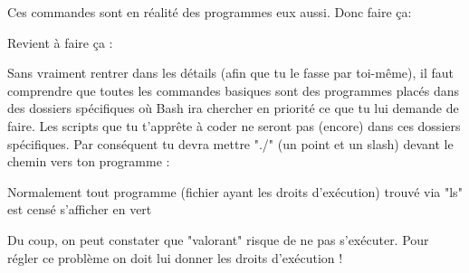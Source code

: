 \documentclass[a4paper, 12pt]{article}
\begin{document}
{    Ces commandes sont en réalité des programmes eux aussi. Donc faire ça:

    Revient à faire ça :
    \vspace{0.6cm}

    Sans vraiment rentrer dans les détails (afin que tu le fasse par toi-même),
    il faut comprendre que toutes les commandes basiques sont des programmes placés dans des
    dossiers spécifiques où Bash ira chercher en priorité ce que tu lui demande de faire.
    \newline \newline
    Les scripts que tu t'apprête à coder ne seront pas (encore) dans ces dossiers spécifiques.
    Par conséquent tu devra mettre "./" (un point et un slash) devant le chemin vers ton programme :


    Normalement tout programme (fichier ayant les droits d'exécution) trouvé via "ls" est censé s'afficher en vert
    \newline \newline
    
    \vspace{3cm}
    

    Du coup, on peut constater que "valorant" risque de ne pas s'exécuter.
    \newline
    Pour régler ce problème on doit lui donner les droits d'exécution !
    
}
\end{document}
